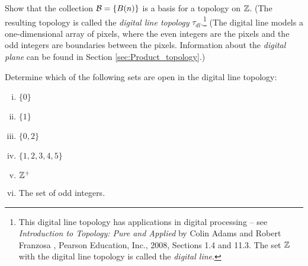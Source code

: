 \ba
\item Show that the collection $\mathcal{B} = \{B(n)\}$ is a basis for a topology on $\mathbb{Z}$. (The resulting topology is called the \emph{digital line topology} $\tau_{dl}$.\footnote{This digital line topology has applications in digital processing -- see \emph{Introduction to Topology: Pure and Applied} by Colin Adams and Robert Franzosa , Pearson Education, Inc., 2008,  Sections 1.4 and 11.3. The set $\mathbb{Z}$ with the digital line topology is called the \emph{digital line}.} (The digital line models a one-dimensional array of pixels, where the even integers are the pixels and the odd integers are boundaries between the pixels. Information about the \emph{digital plane} can be found in Section \ref{sec:Product_topology}.)


\item Determine which of the following sets are open in the digital line topology:
	\begin{enumerate}[i.]
	\item $\{0\}$
	\item $\{1\}$
	\item $\{0, 2\}$
	\item $\{1, 2, 3, 4, 5\}$
	\item $\mathbb{Z}^+$
	\item The set of odd integers.
	 \end{enumerate}
	 
\ea

